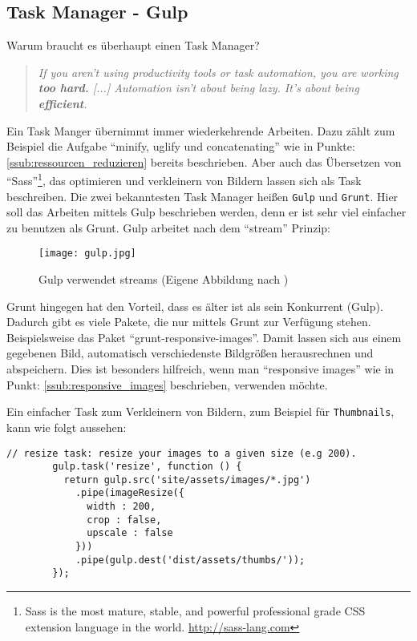 	\subsection{Task Manager - Gulp} %
	\label{sub:task_manager_gulp}
		Warum braucht es überhaupt einen Task Manager?
		\begin{quote}
			\textit{If you aren't using productivity tools or task automation, you are working \textbf{too hard.} [...] Automation isn't about being lazy. It's about being \textbf{efficient}.}\autocite[p. 18,78]{addyOsmani14}
		\end{quote}
		Ein Task Manger übernimmt immer wiederkehrende Arbeiten. Dazu zählt zum Beispiel die Aufgabe "`minify, uglify und concatenating"' wie in Punkte: \ref{ssub:ressourcen_reduzieren} bereits beschrieben. Aber auch das Übersetzen von "`Sass"'\footnote{Sass is the most mature, stable, and powerful professional grade CSS extension language in the world. \url{http://sass-lang.com}}, das optimieren und verkleinern von Bildern lassen sich als Task beschreiben.
		Die zwei bekanntesten Task Manager heißen \texttt{Gulp} und \texttt{Grunt}. Hier soll das Arbeiten mittels Gulp beschrieben werden, denn er ist sehr viel einfacher zu benutzen als Grunt. Gulp arbeitet nach dem "`stream"' Prinzip:

		\begin{figure}[htbp]
			\begin{center}
				\texttt{[image: gulp.jpg]}
				\caption{Gulp verwendet streams (Eigene Abbildung nach \autocite[p. 85]{addyOsmani14})}
				\label{fig:gulp}
			\end{center}
		\end{figure}

		Grunt hingegen hat den Vorteil, dass es älter ist als sein Konkurrent (Gulp). Dadurch gibt es viele Pakete, die nur mittels Grunt zur Verfügung stehen. Beispielsweise das Paket "`grunt-responsive-images"'. Damit lassen sich aus einem gegebenen Bild, automatisch verschiedenste Bildgrößen herausrechnen und abspeichern. Dies ist besonders hilfreich, wenn man "`responsive images"' wie in Punkt: \ref{ssub:responsive_images} beschrieben, verwenden möchte.

		\pagebreak
		
		Ein einfacher Task zum Verkleinern von Bildern, zum Beispiel für \texttt{Thumbnails}, kann wie folgt aussehen:
		\begin{lstlisting}[captionpos=b, caption=Ein Simpler Gulp Task zum verkleinern von Bildern, label=lst:gulpResize, breakatwhitespace=false]
		// resize task: resize your images to a given size (e.g 200).
		gulp.task('resize', function () {
		  return gulp.src('site/assets/images/*.jpg')
		    .pipe(imageResize({
		      width : 200,
		      crop : false,
		      upscale : false
		    }))
		    .pipe(gulp.dest('dist/assets/thumbs/'));
		});
		\end{lstlisting}

